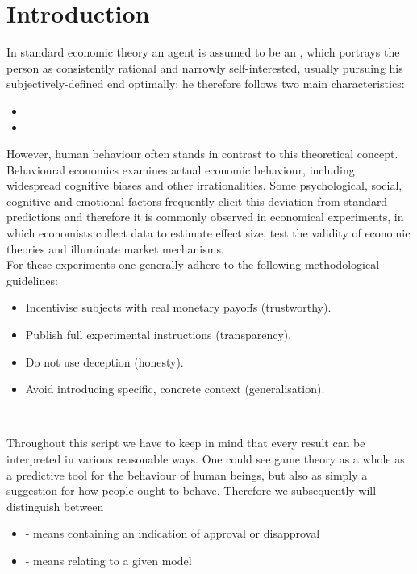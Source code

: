 \chapter*{Introduction} 


In standard economic theory an agent is assumed to be an , which portrays the person as consistently rational and narrowly self-interested, usually pursuing his subjectively-defined end optimally; he therefore follows two main characteristics:
\begin{itemize}
	\item {}
	\item {}
\end{itemize}
However, human behaviour often stands in contrast to this theoretical concept. Behavioural economics examines actual economic behaviour, including widespread cognitive biases and other irrationalities. Some psychological, social, cognitive and emotional factors frequently elicit this deviation from standard predictions and therefore it is commonly observed in economical experiments, in which economists collect data to estimate effect size, test the validity of economic theories and illuminate market mechanisms. \\
For these experiments one generally adhere to the following methodological guidelines:
	\begin{itemize}
		\item Incentivise subjects with real monetary payoffs (trustworthy).
		\item Publish full experimental instructions (transparency).
		\item Do not use deception (honesty).
		\item Avoid introducing specific, concrete context (generalisation).
	\end{itemize}
~	
	
Throughout this script we have to keep in mind that every result can be interpreted in various reasonable ways. One could see game theory as a whole as a predictive tool for the behaviour of human beings, but also as simply a suggestion for how people ought to behave. Therefore we subsequently will distinguish between
\begin{itemize}
	\item {} - means containing an indication of approval or disapproval
	\item {} - means relating to a given model
\end{itemize}